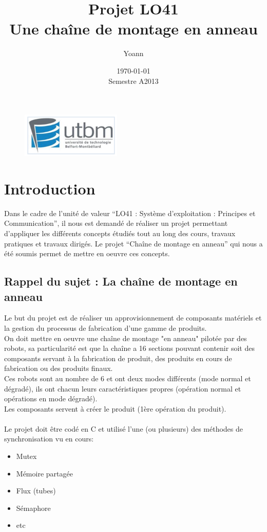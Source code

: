 \documentclass{report}
\begin{document}
\begin{figure}[!p!t]
\includegraphics[height=60pt]{utbm.png}
\end{figure}

\title{Projet LO41\\ \huge{\textbf{Une chaîne de montage en anneau}}}
\author{Yoann }
\date{\today \\Semestre A2013}


\maketitle \clearpage 
\tableofcontents %

\chapter{Introduction}
Dans le cadre de l’unité de valeur “LO41 : Système d'exploitation : Principes et Communication”, il nous est demandé de réaliser un projet permettant d’appliquer les différents concepts étudiés tout au long des cours, travaux pratiques et travaux dirigés. Le projet “Chaîne de montage en anneau” qui nous a été soumis permet de mettre en oeuvre ces concepts.
\section{Rappel du sujet : La chaîne de montage en anneau}
Le but du projet est de réaliser un approvisionnement de composants matériels et la gestion du processus de fabrication d'une gamme de produits.\\
On doit mettre en oeuvre une chaîne de montage "en anneau" pilotée par des robots, sa particularité est que la chaîne a 16 sections pouvant contenir soit des composants servant à la fabrication de produit, des produits en cours de fabrication ou des produits finaux.\\
Ces robots sont au nombre de 6 et ont deux modes différents (mode normal et dégradé), ils ont chacun leurs caractéristiques propres (opération normal et opérations en mode dégradé).\\
Les composants servent à créer le produit (1ère opération du produit).\\\\
Le projet doit être codé en C et utilisé l'une (ou plusieurs) des méthodes de synchronisation vu en cours:
\begin{itemize}
\item Mutex
\item Mémoire partagée
\item Flux (tubes)
\item Sémaphore
\item etc
\end{itemize}
\end{document}

